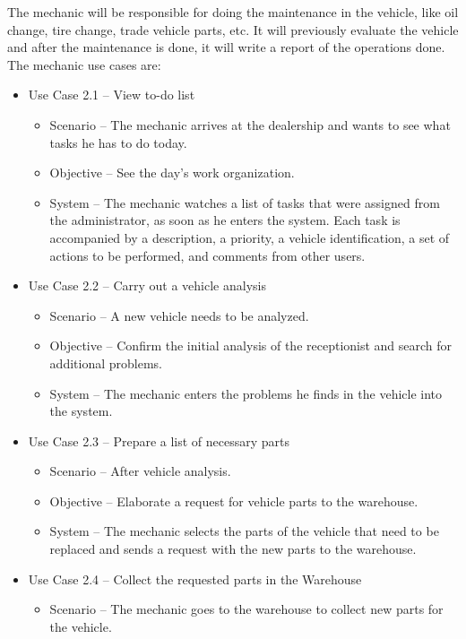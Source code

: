  The mechanic will be responsible for doing the maintenance in the vehicle, like oil change, tire change, trade vehicle parts, etc. 
 It will previously evaluate the vehicle and after the maintenance is done, it will write a report of the operations done. 
 The mechanic use cases are:

  \begin{itemize}
    \item Use Case 2.1 – View to-do list
    \begin{itemize}
      \item Scenario – The mechanic arrives at the dealership and wants to see what tasks he has to do today.
      \item Objective – See the day's work organization.
      \item System – The mechanic watches a list of tasks that were assigned from the administrator, as soon as he enters the system. Each task is accompanied by a description, a priority, a vehicle identification, a set of actions to be performed, and comments from other users. 
    \end{itemize}
    \item Use Case 2.2 – Carry out a vehicle analysis 
    \begin{itemize}
      \item Scenario – A new vehicle needs to be analyzed.
      \item Objective – Confirm the initial analysis of the receptionist and search for additional problems.
      \item System – The mechanic enters the problems he finds in the vehicle into the system. 
    \end{itemize}
    \item Use Case 2.3 – Prepare a list of necessary parts
    \begin{itemize}
      \item Scenario – After vehicle analysis.
      \item Objective – Elaborate a request for vehicle parts to the warehouse.
      \item System – The mechanic selects the parts of the vehicle that need to be replaced and sends a request with the new parts to the warehouse.
    \end{itemize}
    \item Use Case 2.4 – Collect the requested parts in the Warehouse
    \begin{itemize}
      \item Scenario – The mechanic goes to the warehouse to collect new parts for the vehicle.

\end{itemize}
\end{itemize}
